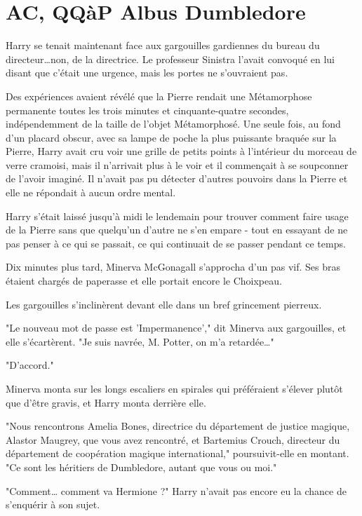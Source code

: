 
\chapter{AC, QQàP   Albus Dumbledore}

Harry se tenait maintenant face aux gargouilles gardiennes du bureau du directeur…non, de la directrice. Le professeur Sinistra l'avait convoqué en lui disant que c'était une urgence, mais les portes ne s'ouvraient pas.

Des expériences avaient révélé que la Pierre rendait une Métamorphose permanente toutes les trois minutes et cinquante-quatre secondes, indépendemment de la taille de l'objet Métamorphosé. Une seule fois, au fond d'un placard obscur, avec sa lampe de poche la plus puissante braquée sur la Pierre, Harry avait cru voir une grille de petits points à l'intérieur du morceau de verre cramoisi, mais il n'arrivait plus à le voir et il commençait à se soupconner de l'avoir imaginé. Il n'avait pas pu détecter d'autres pouvoirs dans la Pierre et elle ne répondait à aucun ordre mental.

Harry s'était laissé jusqu'à midi le lendemain pour trouver comment faire usage de la Pierre sans que quelqu'un d'autre ne s'en empare - tout en essayant de ne pas penser à ce qui se passait, ce qui continuait de se passer pendant ce temps.

Dix minutes plus tard, Minerva McGonagall s'approcha d'un pas vif. Ses bras étaient chargés de paperasse et elle portait encore le Choixpeau.

Les gargouilles s'inclinèrent devant elle dans un bref grincement pierreux.

"Le nouveau mot de passe est 'Impermanence'," dit Minerva aux gargouilles, et elle s'écartèrent. "Je suis navrée, M. Potter, on m'a retardée…"

"D'accord."

Minerva monta sur les longs escaliers en spirales qui préféraient s'élever plutôt que d'être gravis, et Harry monta derrière elle.

"Nous rencontrons Amelia Bones, directrice du département de justice magique, Alastor Maugrey, que vous avez rencontré, et Bartemius Crouch, directeur du département de coopération magique international," poursuivit-elle en montant. "Ce sont les héritiers de Dumbledore, autant que vous ou moi."

"Comment… comment va Hermione ?" Harry n'avait pas encore eu la chance de s'enquérir à son sujet.

